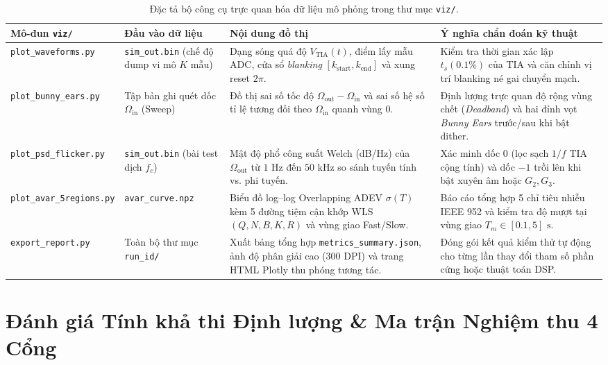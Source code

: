 \documentclass[11pt, a4paper]{article}
\begin{document}
\begin{table}[htbp]
\centering
\caption{Đặc tả bộ công cụ trực quan hóa dữ liệu mô phỏng trong thư mục \texttt{viz/}.}
\label{tab:viz_tools}
\footnotesize
\renewcommand{\arraystretch}{1.2}
\begin{tabular}{@{}L{3.2cm} L{3.0cm} L{5.0cm} L{4.7cm}@{}}
\toprule
\textbf{Mô-đun \texttt{viz/}} & \textbf{Đầu vào dữ liệu} & \textbf{Nội dung đồ thị} & \textbf{Ý nghĩa chẩn đoán kỹ thuật} \\
\midrule
\texttt{plot\_waveforms.py} & \texttt{sim\_out.bin} (chế độ dump vi mô $K$ mẫu) & Dạng sóng quá độ $V_{\text{TIA}}(t)$, điểm lấy mẫu ADC, cửa sổ \emph{blanking} $[k_{\text{start}}, k_{\text{end}}]$ và xung reset $2\pi$. & Kiểm tra thời gian xác lập $t_s(0.1\%)$ của TIA và căn chỉnh vị trí blanking né gai chuyển mạch. \\
\texttt{plot\_bunny\_ears.py} & Tập bản ghi quét dốc $\Omega_{\text{in}}$ (Sweep) & Đồ thị sai số tốc độ $\Omega_{\text{out}} - \Omega_{\text{in}}$ và sai số hệ số tỉ lệ tương đối theo $\Omega_{\text{in}}$ quanh vùng $0$. & Định lượng trực quan độ rộng vùng chết (\emph{Deadband}) và hai đỉnh vọt \emph{Bunny Ears} trước/sau khi bật dither. \\
\texttt{plot\_psd\_flicker.py} & \texttt{sim\_out.bin} (bài test dịch $f_c$) & Mật độ phổ công suất Welch (dB/Hz) của $\Omega_{\text{out}}$ từ $1\text{ Hz}$ đến $50\text{ kHz}$ so sánh tuyến tính vs. phi tuyến. & Xác minh dốc $0$ (lọc sạch $1/f$ TIA cộng tính) và dốc $-1$ trồi lên khi bật xuyên âm hoặc $G_2, G_3$. \\
\texttt{plot\_avar\_5regions.py} & \texttt{avar\_curve.npz} & Biểu đồ log--log Overlapping ADEV $\sigma(T)$ kèm 5 đường tiệm cận khớp WLS $(Q, N, B, K, R)$ và vùng giao Fast/Slow. & Báo cáo tổng hợp 5 chỉ tiêu nhiễu IEEE 952 và kiểm tra độ mượt tại vùng giao $T_m \in [0.1, 5]\text{ s}$. \\
\texttt{export\_report.py} & Toàn bộ thư mục \texttt{run\_id/} & Xuất bảng tổng hợp \texttt{metrics\_summary.json}, ảnh độ phân giải cao (300 DPI) và trang HTML Plotly thu phóng tương tác. & Đóng gói kết quả kiểm thử tự động cho từng lần thay đổi tham số phần cứng hoặc thuật toán DSP. \\
\bottomrule
\end{tabular}
\end{table}

\section{Đánh giá Tính khả thi Định lượng \& Ma trận Nghiệm thu 4 Cổng}
\end{document}
